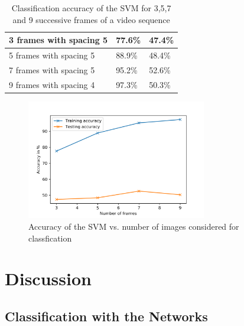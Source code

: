 \documentclass[11pt]{report}
\begin{document}
\begin{table}[]
\centering
\begin{tabular}{|l|l|l|}
\hline
3 frames with spacing 5 & 77.6\% & 47.4\% \\ \hline
5 frames with spacing 5 & 88.9\% & 48.4\% \\ \hline
7 frames with spacing 5 & 95.2\% & 52.6\% \\ \hline
9 frames with spacing 4 & 97.3\% & 50.3\% \\ \hline
\end{tabular}
\caption{Classification accuracy of the SVM for 3,5,7 and 9 successive frames of a video sequence}
\label{result_table_SMV}
\end{table}

\begin{figure}
  \centering
  \includegraphics[width=0.7\textwidth]{AccuracySVM.png}
  \caption{Accuracy of the SVM vs. number of images considered for classfication}
  \label{result_fig_svm}
\end{figure}


\chapter{Discussion}
\section{Classification with the Networks}
\end{document}
